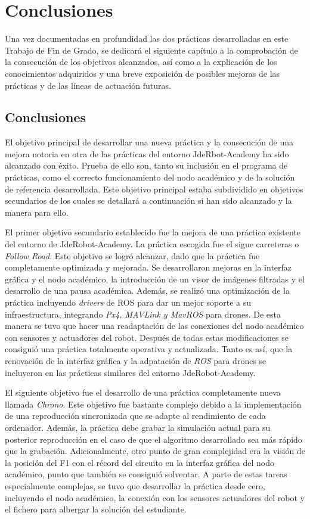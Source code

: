 \chapter{Conclusiones}\label{cap.conclusiones}
Una vez documentadas en profundidad las dos prácticas desarrolladas en este Trabajo de Fin de Grado, se dedicará el siguiente capítulo a la comprobación de la consecución de los objetivos alcanzados, así como a la explicación de los conocimientos adquiridos y una breve exposición de posibles mejoras de las prácticas y de las líneas de actuación futuras.

\section{Conclusiones}
El objetivo principal de desarrollar una nueva práctica y la consecución de una mejora notoria en otra de las prácticas del entorno JdeRbot-Academy ha sido alcanzado con éxito. Prueba de ello son, tanto su inclusión en el programa de prácticas, como el correcto funcionamiento del nodo académico y de la solución de referencia desarrollada. Este objetivo principal estaba subdividido en objetivos secundarios de los cuales se detallará a continuación si han sido alcanzado y la manera para ello.

El primer objetivo secundario establecido fue la mejora de una práctica existente del entorno de JdeRobot-Academy. La práctica escogida fue el sigue carreteras o \textit{Follow Road}. Este objetivo se logró alcanzar, dado que la práctica fue completamente optimizada y mejorada. Se desarrollaron mejoras en la interfaz gráfica y el nodo académico, la introducción de un visor de imágenes filtradas y el desarrollo de una pausa académica. Además, se realizó una optimización de la práctica incluyendo \textit{drivers} de ROS para dar un mejor soporte a su infraestructura, integrando  \textit{Px4, MAVLink y MavROS} para drones. De esta manera se tuvo que hacer una readaptación de las conexiones del nodo académico con sensores y actuadores del robot. Después de todas estas modificaciones se consiguió una práctica totalmente operativa y actualizada. Tanto es así, que la renovación de la interfaz gráfica y la adpatación de \textit{ROS} para drones se incluyeron en las prácticas similares del entorno JdeRobot-Academy.

El siguiente objetivo fue el desarrollo de una práctica completamente nueva llamada \textit{Chrono}. Este objetivo fue bastante complejo debido a la implementación de una reproducción sincronizada que se adapte al rendimiento de cada ordenador. Además, la práctica debe grabar la simulación actual para su posterior reproducción en el caso de que el algoritmo desarrollado sea más rápido que la grabación. Adicionalmente, otro punto de gran complejidad era la visión de la posición del F1 con el récord del circuito en la interfaz gráfica del nodo académico, punto que también se consiguió solventar. A parte de estas tareas especialmente complejas, se tuvo que desarrollar la práctica desde cero, incluyendo el nodo académico, la conexión con los sensores actuadores del robot y el fichero para albergar la solución del estudiante.

